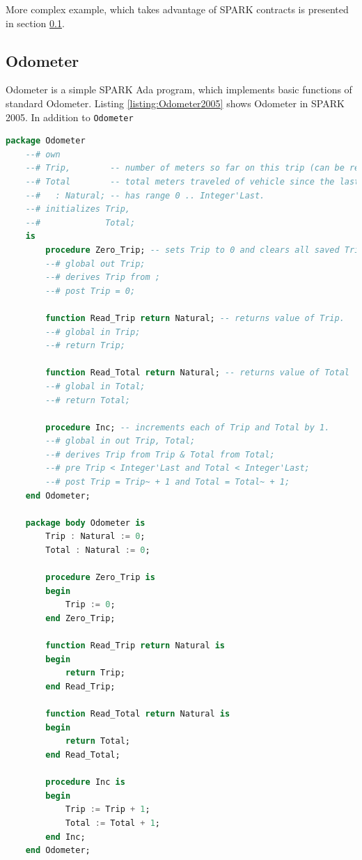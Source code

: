 More complex example, which takes advantage of SPARK contracts is presented in section \ref{pcapumpimpl:beagleboard:odometer}.

\subsection{Odometer}
\label{pcapumpimpl:beagleboard:odometer}

Odometer is a simple SPARK Ada program, which implements basic functions of standard Odometer. Listing \ref{listing:Odometer2005} shows Odometer in SPARK 2005. In addition to \lstinline{Odometer}

\singlespacing
\begin{lstlisting}[language=ada, frame=single, gobble=0, caption={SPARK 2005 code: Odometer}, label={listing:Odometer2005}]
	package Odometer
	--# own
	--# Trip,        -- number of meters so far on this trip (can be reset to 0).
	--# Total        -- total meters traveled of vehicle since the last factory-reset.
	--#   : Natural; -- has range 0 .. Integer'Last.
	--# initializes Trip,
	--#             Total;
	is
	    procedure Zero_Trip; -- sets Trip to 0 and clears all saved Trip marks.
	    --# global out Trip;
	    --# derives Trip from ;
	    --# post Trip = 0;
	    
	    function Read_Trip return Natural; -- returns value of Trip.
	    --# global in Trip;
	    --# return Trip;
	    
	    function Read_Total return Natural; -- returns value of Total
	    --# global in Total;
	    --# return Total;
	    
	    procedure Inc; -- increments each of Trip and Total by 1.
	    --# global in out Trip, Total;
	    --# derives Trip from Trip & Total from Total;
	    --# pre Trip < Integer'Last and Total < Integer'Last;
	    --# post Trip = Trip~ + 1 and Total = Total~ + 1;	    
	end Odometer;

	package body Odometer is
	    Trip : Natural := 0;
	    Total : Natural := 0;
	    
	    procedure Zero_Trip is
	    begin
	        Trip := 0;
	    end Zero_Trip;
	    
	    function Read_Trip return Natural is
	    begin
	        return Trip;
	    end Read_Trip;
	    
	    function Read_Total return Natural is
	    begin
	        return Total;
	    end Read_Total;
	    
	    procedure Inc is
	    begin
	        Trip := Trip + 1;
	        Total := Total + 1;
	    end Inc;
	end Odometer;
\end{lstlisting} 
\doublespacing

